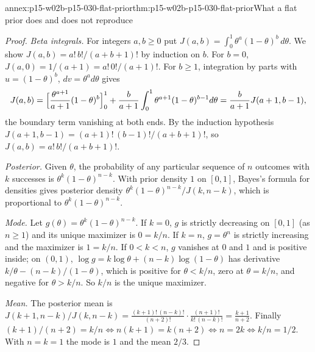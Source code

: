 \begin{annexitem}{annex:p15-w02b-p15-030-flat-prior}{thm:p15-w02b-p15-030-flat-prior}{What a flat prior does and does not reproduce}
\begin{proof}
\emph{Beta integrals.} For integers \(a,b\geq0\) put
\(J(a,b)=\int_0^1\theta^a(1-\theta)^b\,d\theta\). We show
\(J(a,b)=a!\,b!/(a+b+1)!\) by induction on \(b\). For \(b=0\),
\(J(a,0)=1/(a+1)=a!\,0!/(a+1)!\). For \(b\geq1\), integration by parts with
\(u=(1-\theta)^b\), \(dv=\theta^a d\theta\) gives
\[
 J(a,b)=\Bigl[\frac{\theta^{a+1}}{a+1}(1-\theta)^b\Bigr]_0^1
 +\frac{b}{a+1}\int_0^1\theta^{a+1}(1-\theta)^{b-1}d\theta
 =\frac{b}{a+1}J(a+1,b-1),
\]
the boundary term vanishing at both ends. By the induction hypothesis
\(J(a+1,b-1)=(a+1)!\,(b-1)!/(a+b+1)!\), so
\(J(a,b)=a!\,b!/(a+b+1)!\).

\emph{Posterior.} Given \(\theta\), the probability of any particular
sequence of \(n\) outcomes with \(k\) successes is
\(\theta^k(1-\theta)^{n-k}\). With prior density \(1\) on \([0,1]\), Bayes's
formula for densities gives posterior density
\(\theta^k(1-\theta)^{n-k}/J(k,n-k)\), which is proportional to
\(\theta^k(1-\theta)^{n-k}\).

\emph{Mode.} Let \(g(\theta)=\theta^k(1-\theta)^{n-k}\). If \(k=0\), \(g\) is
strictly decreasing on \([0,1]\) (as \(n\geq1\)) and its unique maximizer is
\(0=k/n\). If \(k=n\), \(g=\theta^n\) is strictly increasing and the maximizer
is \(1=k/n\). If \(0<k<n\), \(g\) vanishes at \(0\) and \(1\) and is positive
inside; on \((0,1)\), \(\log g=k\log\theta+(n-k)\log(1-\theta)\) has derivative
\(k/\theta-(n-k)/(1-\theta)\), which is positive for \(\theta<k/n\), zero at
\(\theta=k/n\), and negative for \(\theta>k/n\). So \(k/n\) is the unique
maximizer.

\emph{Mean.} The posterior mean is
\(J(k+1,n-k)/J(k,n-k)=\frac{(k+1)!\,(n-k)!}{(n+2)!}\cdot\frac{(n+1)!}{k!\,(n-k)!}=\frac{k+1}{n+2}\).
Finally \((k+1)/(n+2)=k/n\iff n(k+1)=k(n+2)\iff n=2k\iff k/n=1/2\). With
\(n=k=1\) the mode is \(1\) and the mean \(2/3\).
\end{proof}
\end{annexitem}

